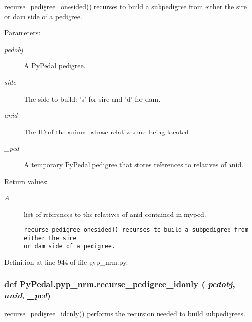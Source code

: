\hyperlink{namespacePyPedal_1_1pyp__nrm_71cc351a78e2a8f9b528a5e696efecc2}{recurse\_\-pedigree\_\-onesided()} recurses to build a subpedigree from either the sire or dam side of a pedigree. 

\begin{Desc}
\item[Parameters:]
\begin{description}
\item[{\em pedobj}]A Py\-Pedal pedigree. \item[{\em side}]The side to build: 's' for sire and 'd' for dam. \item[{\em anid}]The ID of the animal whose relatives are being located. \item[{\em \_\-ped}]A temporary Py\-Pedal pedigree that stores references to relatives of anid. \end{description}
\end{Desc}
\begin{Desc}
\item[Return values:]
\begin{description}
\item[{\em A}]list of references to the relatives of anid contained in myped.

\footnotesize\begin{verbatim}recurse_pedigree_onesided() recurses to build a subpedigree from either the sire
or dam side of a pedigree.
\end{verbatim}
\normalsize
 \end{description}
\end{Desc}


Definition at line 944 of file pyp\_\-nrm.py.\hypertarget{namespacePyPedal_1_1pyp__nrm_0497f483c9c840213e97cff287417c71}{
\subsubsection[recurse\_\-pedigree\_\-idonly]{\setlength{\rightskip}{0pt plus 5cm}def Py\-Pedal.pyp\_\-nrm.recurse\_\-pedigree\_\-idonly ( {\em pedobj},  {\em anid},  {\em \_\-ped})}}
\label{namespacePyPedal_1_1pyp__nrm_0497f483c9c840213e97cff287417c71}


\hyperlink{namespacePyPedal_1_1pyp__nrm_0497f483c9c840213e97cff287417c71}{recurse\_\-pedigree\_\-idonly()} performs the recursion needed to build subpedigrees. 


